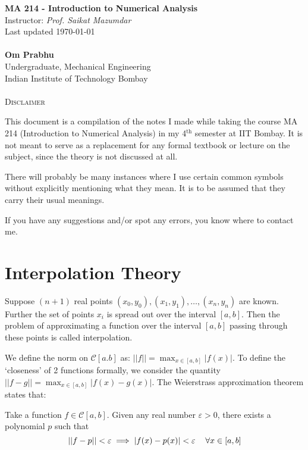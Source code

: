 \documentclass[11pt]{article}
\theoremstyle{definition}
\let\e\varepsilon
\newcommand{\C}{\mathcal{C}}
\begin{document}
\begin{center}
{\LARGE \bf MA 214 - Introduction to Numerical Analysis}\\
{Instructor: \textit{Prof. Saikat Mazumdar}}\\
Last updated \today \\~\\
{\large \bf Om Prabhu}\\
Undergraduate, Mechanical Engineering\\
Indian Institute of Technology Bombay\\~\\
\textsc{Disclaimer}
\end{center}
\vspace{-6pt}

This document is a compilation of the notes I made while taking the course MA 214 (Introduction to Numerical Analysis) in my 4$^{\text{th}}$ semester at IIT Bombay. It is not meant to serve as a replacement for any formal textbook or lecture on the subject, since the theory is not discussed at all.

There will probably be many instances where I use certain common symbols without explicitly mentioning what they mean. It is to be assumed that they carry their usual meanings.

If you have any suggestions and/or spot any errors, you know where to contact me.

\hrulefill
\tableofcontents
\hrulefill
\pagebreak
\section{Interpolation Theory}
Suppose $(n+1)$ real points $(x_0,y_0), (x_1,y_1),\dots,(x_n,y_n)$ are known. Further the set of points $x_i$ is spread out over the interval $[a,b]$. Then the problem of approximating a function over the interval $[a,b]$ passing through these points is called interpolation.

We define the norm on $\mathcal{C}[a.b]$ as:
$||f||=\max_{x\in[a,b]}|f(x)|$. To define the `closeness' of 2 functions formally, we consider the quantity
$||f-g||=\max_{x\in [a,b]}\left|f(x)-g(x)\right|$. The Weierstrass approximation theorem states that:

Take a function $f\in\C[a,b]$. Given any real number $\e>0$, there exists a polynomial $p$ such that 
$$||f-p||<\e\implies |f(x)-p(x)|<\e\text{\hspace{12pt}}\forall x\in[a,b]$$
\end{document}
